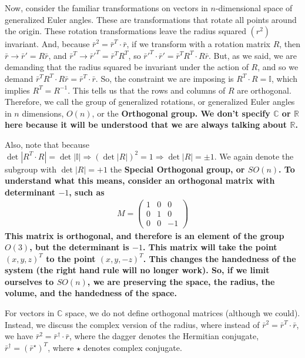 \documentclass[12pt,epsf]{article}
\def\nolabel{\nonumber }
\def\nolabel{\nonumber }
\begin{document}
Now, consider the familiar transformations on vectors in
$n$-dimensional space of generalized Euler angles.  These are
transformations that rotate all points around the origin.  These
rotation transformations leave the radius squared $(r^2)$ invariant. 
And, because $\bar r^2 = \bar r^T \cdot \bar r$, if we transform with a
rotation matrix $R$, then $\bar r \rightarrow \bar r' = R\bar r$, and
$\bar r^T \rightarrow \bar r'^T = \bar r^T R^T$, so $\bar r'^T \cdot
\bar r' = \bar r^TR^T \cdot R \bar r$.	But, as we said, we are
demanding that the radius squared be invariant under the action of $R$,
and so we demand $\bar r^TR^T\cdot R\bar r = \bar r^T \cdot \bar r$. 
So, the constraint we are imposing is $R^T\cdot R = \mathbb{I}$, which
implies $R^T = R^{-1}$.  This tells us that the rows and columns of $R$
are orthogonal.  Therefore, we call the group of generalized rotations,
or generalized Euler angles in $n$ dimensions, $O(n)$, or the \bf
Orthogonal \rm group.  We don't specify $\mathbb{C}$ or $\mathbb{R}$
here because it will be understood that we are always talking about
$\mathbb{R}$.  

Also, note that because $\det|R^T\cdot R| = \det|\mathbb{I}| \Rightarrow
(\det|R|)^2 = 1 \Rightarrow \det|R| = \pm 1$.  We again denote the
subgroup with $\det|R| = +1$ the \bf Special Orthogonal \rm group, or
$SO(n)$.  To understand what this means, consider an orthogonal matrix
with determinant $-1$, such as 
\begin{eqnarray}
M = 
\begin{pmatrix}
1 & 0 & 0 \\ 0 & 1 & 0 \\ 0 & 0 & -1
\end{pmatrix} \nolabel 
\end{eqnarray}
This matrix is orthogonal, and therefore is an element of the group
$O(3)$, but the determinant is $-1$.  This matrix will take the point
$(x,y,z)^T$ to the point $(x,y,-z)^T$.	This changes the handedness of
the system (the right hand rule will no longer work).  So, if we limit
ourselves to $SO(n)$, we are preserving the space, the radius, the
volume, and the handedness of the space.  

For vectors in $\mathbb{C}$ space, we do not define orthogonal matrices
(although we could).  Instead, we discuss the complex version of the
radius, where instead of $\bar r^2 = \bar r^T \cdot \bar r$, we have
$\bar r^2 = \bar r^{\dagger} \cdot \bar r$, where the dagger denotes
the Hermitian conjugate, $\bar r^{\dagger} = (\bar r^{\star})^T$, where
$\star$ denotes complex conjugate.  
\end{document}
